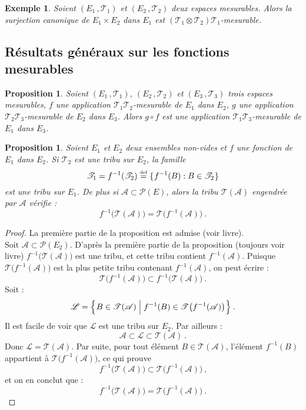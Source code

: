 \documentclass{scrreport}
\theoremstyle{def}
\newtheorem{example}[definition]{Exemple}
\theoremstyle{thm}
\theoremstyle{prop}
\newtheorem{proposition}[definition]{Proposition}
\theoremstyle{rem}
\numberwithin{definition}{section}
\numberwithin{lemma}{section}
\numberwithin{proposition}{section}
\numberwithin{theorem}{section}
\numberwithin{corol}{section}
\numberwithin{notation}{section}
\numberwithin{example}{section}
\numberwithin{exercise}{section}
\numberwithin{remark}{section}
\newcommand{\defeq}{\stackrel{\text{\tiny{\textnormal{def}}}}{=}}
\newcommand{\scrA}{\mathscr{A}}
\newcommand{\scrL}{\mathscr{L}}
\newcommand{\scrP}{\mathscr{P}}
\newcommand{\scrT}{\mathscr{T}}
\newcommand{\p}{\:\!}
\begin{document}
\begin{example}\label{expl1:5:6}
	Soient \((E_1\,, \scrT_1)\) et \((E_2\,, \scrT_2)\) deux espaces mesurables. Alors la surjection canonique de \(E_1 \times E_2\) dans \(E_1\) est \((\scrT_1 \otimes \scrT_2) \scrT_1\)-mesurable.
\end{example}

\subsection{Résultats généraux sur les fonctions mesurables}

\begin{proposition}\label{prop1:5:7}
	Soient \((E_1\,, \scrT_1)\), \((E_2\,, \scrT_2)\) et \((E_3\,, \scrT_3)\) trois espaces mesurables, \(f\) une application \(\scrT_1 \scrT_2\)-mesurable de \(E_1\) dans \(E_2\), \(g\) une application \(\scrT_2 \scrT_3\)-mesurable de \(E_2\) dans \(E_3\). Alors \(g \circ f\) est une application \(\scrT_1 \scrT_3\)-mesurable de \(E_1\) dans \(E_3\).
\end{proposition}

\begin{proposition}\label{prop1:5:8}
	Soient \(E_1\) et \(E_2\) deux ensembles non-vides et \(f\) une fonction de \(E_1\) dans \(E_2\). Si \(\scrT_2\) est une tribu sur \(E_2\), la famille
	\[ \scrT_1 = f^{-1}(\scrT_2) \defeq \{\p f^{-1}(B) \mathrel{:} B \in \scrT_2 \p\} \]
	est une tribu sur \(E_1\). De plus si \(\scrA \subset \scrP(E)\), alors la tribu \(\scrT(\scrA)\) engendrée par \(\scrA\) vérifie :
	\[ f^{-1}\bigl(\scrT(\scrA)\bigr) = \scrT\bigl(f^{-1}(\scrA)\bigr) \: \text{.} \]
\end{proposition}

\begin{proof}
	La première partie de la proposition est admise (voir livre). \\ \indent
	Soit \(\scrA \subset \scrP(E_2)\). D'après la première partie de la proposition (toujours voir livre) \(f^{-1}\bigl(\scrT(\scrA)\bigr)\) est une tribu, et cette tribu contient \(f^{-1}(\scrA)\). Puisque \(\scrT\bigl(f^{-1}(\scrA)\bigr)\) est la plus petite tribu contenant \(f^{-1}(\scrA)\), on peut écrire :
	\[ \scrT\bigl(f^{-1}(\scrA)\bigr) \subset f^{-1}\bigl(\scrT(\scrA)\bigr) \: \text{.} \]
	Soit :
	\[ \scrL = \Bigl\{\p B \in \scrT(\scrA) \mathrel{\Big|} f^{-1}(B) \in \scrT\bigl(f^{-1}(\scrA)\bigr) \p\Bigr\} \: \text{.} \]
	Il est facile de voir que \(\scrL\) est une tribu sur \(E_2\). Par ailleurs :
	\[ \scrA \subset \scrL \subset \scrT(\scrA) \: \text{.} \]
	Donc \(\scrL = \scrT(\scrA)\). Par suite, pour tout élément \(B \in \scrT(\scrA)\), l'élément \(f^{-1}(B)\) appartient à \(\scrT\bigl(f^{-1}(\scrA)\bigr)\), ce qui prouve
	\[ f^{-1}\bigl(\scrT(\scrA)\bigr) \subset \scrT\bigl(f^{-1}(\scrA)\bigr) \: \text{,} \]
	et on en conclut que :
	\[ f^{-1}\bigl(\scrT(\scrA)\bigr) = \scrT\bigl(f^{-1}(\scrA)\bigr) \: \text{.} \]
\end{proof}
\end{document}
